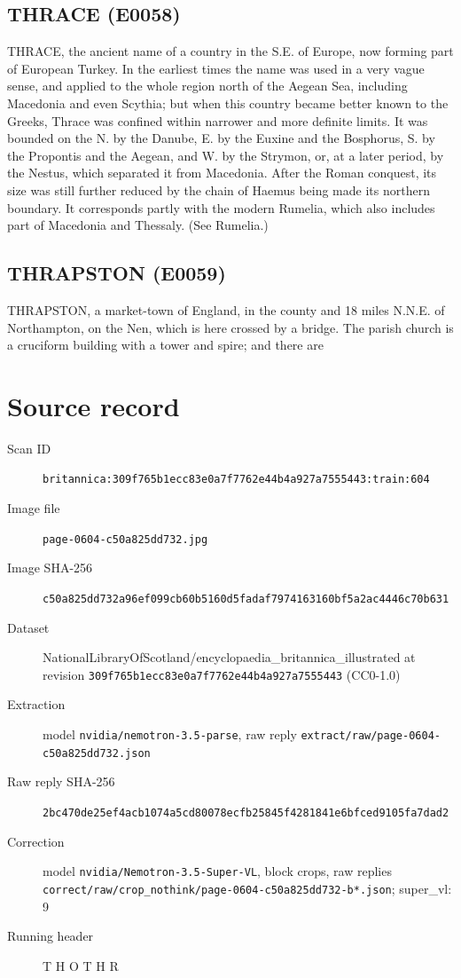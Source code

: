 \documentclass{article}
\begin{document}
\subsection*{THRACE (E0058)}
THRACE, the ancient name of a country in the S.E. of Europe, now forming part of European Turkey. In the earliest times the name was used in a very vague sense, and applied to the whole region north of the Aegean Sea, including Macedonia and even Scythia; but when this country became better known to the Greeks, Thrace was confined within narrower and more definite limits. It was bounded on the N. by the Danube, E. by the Euxine and the Bosphorus, S. by the Propontis and the Aegean, and W. by the Strymon, or, at a later period, by the Nestus, which separated it from Macedonia. After the Roman conquest, its size was still further reduced by the chain of Haemus being made its northern boundary. It corresponds partly with the modern Rumelia, which also includes part of Macedonia and Thessaly. (See Rumelia.)

\subsection*{THRAPSTON (E0059)}
THRAPSTON, a market-town of England, in the county and 18 miles N.N.E. of Northampton, on the Nen, which is here crossed by a bridge. The parish church is a cruciform building with a tower and spire; and there are


\section*{Source record}
\begin{description}
\item[Scan ID] \texttt{britannica:309f765b1ecc83e0a7f7762e44b4a927a7555443:train:604}
\item[Image file] \texttt{page-0604-c50a825dd732.jpg}
\item[Image SHA-256] \texttt{c50a825dd732a96ef099cb60b5160d5fadaf7974163160bf5a2ac4446c70b631}
\item[Dataset] NationalLibraryOfScotland/encyclopaedia\_britannica\_illustrated at revision \texttt{309f765b1ecc83e0a7f7762e44b4a927a7555443} (CC0-1.0)
\item[Extraction] model \texttt{nvidia/nemotron-3.5-parse}, raw reply \texttt{extract/raw/page-0604-c50a825dd732.json}
\item[Raw reply SHA-256] \texttt{2bc470de25ef4acb1074a5cd80078ecfb25845f4281841e6bfced9105fa7dad2}
\item[Correction] model \texttt{nvidia/Nemotron-3.5-Super-VL}, block crops, raw replies \texttt{correct/raw/crop\_nothink/page-0604-c50a825dd732-b*.json}; super\_vl: 9
\item[Running header] T H O T H R
\end{description}
\end{document}

